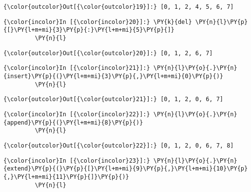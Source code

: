             \begin{Verbatim}[commandchars=\\\{\}]
{\color{outcolor}Out[{\color{outcolor}19}]:} [0, 1, 2, 4, 5, 6, 7]
\end{Verbatim}
        
    \begin{Verbatim}[commandchars=\\\{\}]
{\color{incolor}In [{\color{incolor}20}]:} \PY{k}{del} \PY{n}{l}\PY{p}{[}\PY{l+m+mi}{3}\PY{p}{:}\PY{l+m+mi}{5}\PY{p}{]}
         \PY{n}{l}
\end{Verbatim}

            \begin{Verbatim}[commandchars=\\\{\}]
{\color{outcolor}Out[{\color{outcolor}20}]:} [0, 1, 2, 6, 7]
\end{Verbatim}
        
    \begin{Verbatim}[commandchars=\\\{\}]
{\color{incolor}In [{\color{incolor}21}]:} \PY{n}{l}\PY{o}{.}\PY{n}{insert}\PY{p}{(}\PY{l+m+mi}{3}\PY{p}{,}\PY{l+m+mi}{0}\PY{p}{)}
         \PY{n}{l}
\end{Verbatim}

            \begin{Verbatim}[commandchars=\\\{\}]
{\color{outcolor}Out[{\color{outcolor}21}]:} [0, 1, 2, 0, 6, 7]
\end{Verbatim}
        
    \begin{Verbatim}[commandchars=\\\{\}]
{\color{incolor}In [{\color{incolor}22}]:} \PY{n}{l}\PY{o}{.}\PY{n}{append}\PY{p}{(}\PY{l+m+mi}{8}\PY{p}{)}
         \PY{n}{l}
\end{Verbatim}

            \begin{Verbatim}[commandchars=\\\{\}]
{\color{outcolor}Out[{\color{outcolor}22}]:} [0, 1, 2, 0, 6, 7, 8]
\end{Verbatim}
        
    \begin{Verbatim}[commandchars=\\\{\}]
{\color{incolor}In [{\color{incolor}23}]:} \PY{n}{l}\PY{o}{.}\PY{n}{extend}\PY{p}{(}\PY{p}{[}\PY{l+m+mi}{9}\PY{p}{,}\PY{l+m+mi}{10}\PY{p}{,}\PY{l+m+mi}{11}\PY{p}{]}\PY{p}{)}
         \PY{n}{l}
\end{Verbatim}

